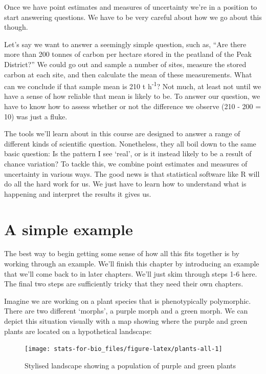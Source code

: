 \documentclass[]{book}
\begin{document}
Once we have point estimates and measures of uncertainty we're in a
position to start answering questions. We have to be very careful about
how we go about this though.

Let's say we want to answer a seemingly simple question, such as, ``Are
there more than 200 tonnes of carbon per hectare stored in the peatland
of the Peak District?'' We could go out and sample a number of sites,
measure the stored carbon at each site, and then calculate the mean of
these measurements. What can we conclude if that sample mean is 210 t
h\textsuperscript{-1}? Not much, at least not until we have a sense of
how reliable that mean is likely to be. To answer our question, we have
to know how to assess whether or not the difference we observe (210 -
200 = 10) was just a fluke.

The tools we'll learn about in this course are designed to answer a
range of different kinds of scientific question. Nonetheless, they all
boil down to the same basic question: Is the pattern I see `real', or is
it instead likely to be a result of chance variation? To tackle this, we
combine point estimates and measures of uncertainty in various ways. The
good news is that statistical software like R will do all the hard work
for us. We just have to learn how to understand what is happening and
interpret the results it gives us.

\section{A simple example}\label{morph-example}

The best way to begin getting some sense of how all this fits together
is by working through an example. We'll finish this chapter by
introducing an example that we'll come back to in later chapters. We'll
just skim through steps 1-6 here. The final two steps are sufficiently
tricky that they need their own chapters.

Imagine we are working on a plant species that is phenotypically
polymorphic. There are two different `morphs', a purple morph and a
green morph. We can depict this situation visually with a map showing
where the purple and green plants are located on a hypothetical
landscape:

\begin{figure}

{\centering \texttt{[image: stats-for-bio\_files/figure-latex/plants-all-1]} 

}

\caption{Stylised landscape showing a population of purple and green plants}\label{fig:plants-all}
\end{figure}
\end{document}
